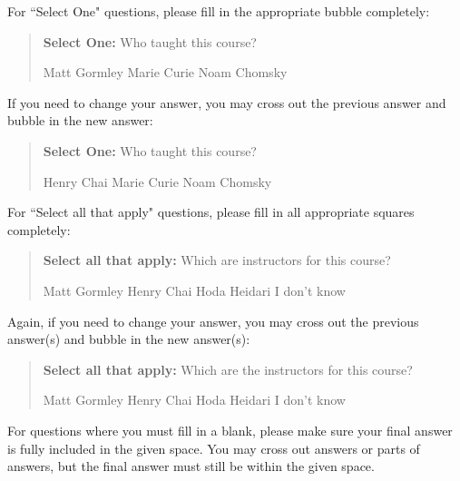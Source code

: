 \documentclass[11pt,addpoints,answers]{exam}
\newcommand{\blackcircle}{\tikz\draw[black,fill=black] (0,0) circle (1ex);}
\begin{document}
For ``Select One" questions, please fill in the appropriate bubble completely:

\begin{quote}
\textbf{Select One:} Who taught this course?
    \begin{checkboxes}
     \CorrectChoice Matt Gormley
     \choice Marie Curie
     \choice Noam Chomsky
    \end{checkboxes}
\end{quote}

If you need to change your answer, you may cross out the previous answer and bubble in the new answer:

\begin{quote}
\textbf{Select One:} Who taught this course?
    {
    \begin{checkboxes}
     \CorrectChoice Henry Chai
     \choice Marie Curie \checkboxchar{\xcancel{\blackcircle}{}}
     \choice Noam Chomsky
    \end{checkboxes}
    }
\end{quote}

For ``Select all that apply" questions, please fill in all appropriate squares completely:

\begin{quote}
\textbf{Select all that apply:} Which are instructors for this course?
    {%
    \checkboxchar{$\Box$} \checkedchar{$\blacksquare$} %
    \begin{checkboxes}
    \CorrectChoice Matt Gormley  
    \CorrectChoice Henry Chai
    \CorrectChoice Hoda Heidari
    \choice I don't know
    \end{checkboxes}
    }
\end{quote}

Again, if you need to change your answer, you may cross out the previous answer(s) and bubble in the new answer(s):

\begin{quote}
\textbf{Select all that apply:} Which are the instructors for this course?
    {%
    \checkboxchar{\xcancel{$\blacksquare$}} \checkedchar{$\blacksquare$} %
    \begin{checkboxes}
    \CorrectChoice Matt Gormley 
    \CorrectChoice Henry Chai
    \CorrectChoice Hoda Heidari
    \choice I don't know
    \end{checkboxes}
    }
\end{quote}

For questions where you must fill in a blank, please make sure your final answer is fully included in the given space. You may cross out answers or parts of answers, but the final answer must still be within the given space.
\end{document}
